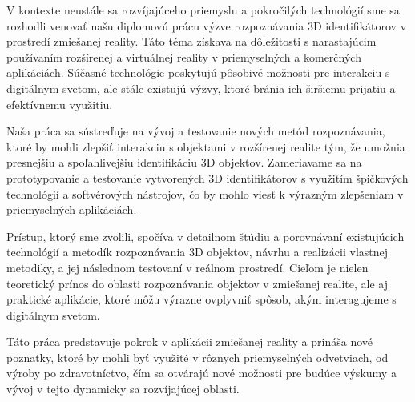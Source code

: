 V kontexte neustále sa rozvíjajúceho priemyslu a pokročilých technológií sme sa rozhodli venovať našu diplomovú prácu výzve rozpoznávania 3D identifikátorov v prostredí zmiešanej reality. Táto téma získava na dôležitosti s narastajúcim používaním rozšírenej a virtuálnej reality v priemyselných a komerčných aplikáciách. Súčasné technológie poskytujú pôsobivé možnosti pre interakciu s digitálnym svetom, ale stále existujú výzvy, ktoré bránia ich širšiemu prijatiu a efektívnemu využitiu.

Naša práca sa sústreďuje na vývoj a testovanie nových metód rozpoznávania, ktoré by mohli zlepšiť interakciu s objektami v rozšírenej realite tým, že umožnia presnejšiu a spoľahlivejšiu identifikáciu 3D objektov. Zameriavame sa na prototypovanie a testovanie vytvorených 3D identifikátorov s využitím špičkových technológií a softvérových nástrojov, čo by mohlo viesť k výrazným zlepšeniam v priemyselných aplikáciách.

Prístup, ktorý sme zvolili, spočíva v detailnom štúdiu a porovnávaní existujúcich technológií a metodík rozpoznávania 3D objektov, návrhu a realizácii vlastnej metodiky, a jej následnom testovaní v reálnom prostredí. Cieľom je nielen teoretický prínos do oblasti rozpoznávania objektov v zmiešanej realite, ale aj praktické aplikácie, ktoré môžu výrazne ovplyvniť spôsob, akým interagujeme s digitálnym svetom.

Táto práca predstavuje pokrok v aplikácii zmiešanej reality a prináša nové poznatky, ktoré by mohli byť využité v rôznych priemyselných odvetviach, od výroby po zdravotníctvo, čím sa otvárajú nové možnosti pre budúce výskumy a vývoj v tejto dynamicky sa rozvíjajúcej oblasti.